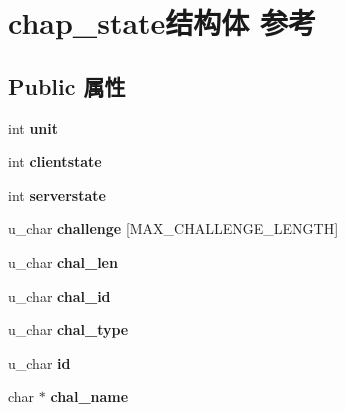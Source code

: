 \hypertarget{structchap__state}{}\section{chap\+\_\+state结构体 参考}
\label{structchap__state}
\subsection*{Public 属性}
\begin{DoxyCompactItemize}
\item 
\mbox{\label{structchap__state_a01ffde483a24c28432ff85f5bd2199c9}} 
int {\bfseries unit}
\item 
\mbox{\label{structchap__state_a575cfd919a0e27c5e54d925aebf8072b}} 
int {\bfseries clientstate}
\item 
\mbox{\label{structchap__state_a679bd23256cec82b05f8331ad7daa7df}} 
int {\bfseries serverstate}
\item 
\mbox{\label{structchap__state_ae75ec6f82ce119c1e97dd02bd5ee96df}} 
u\+\_\+char {\bfseries challenge} \mbox{[}M\+A\+X\+\_\+\+C\+H\+A\+L\+L\+E\+N\+G\+E\+\_\+\+L\+E\+N\+G\+TH\mbox{]}
\item 
\mbox{\label{structchap__state_a7668afc28040ada978fb22db0d34f248}} 
u\+\_\+char {\bfseries chal\+\_\+len}
\item 
\mbox{\label{structchap__state_af73bc4d37575b9405353f3d00d2227d3}} 
u\+\_\+char {\bfseries chal\+\_\+id}
\item 
\mbox{\label{structchap__state_a40332b711b680d3fe127d9855d230abb}} 
u\+\_\+char {\bfseries chal\+\_\+type}
\item 
\mbox{\label{structchap__state_a8d8751b4f12637227ebddb2db53f1a71}} 
u\+\_\+char {\bfseries id}
\item 
\mbox{\label{structchap__state_a43f27cb4de836c37823620b601286faa}} 
char $\ast$ {\bfseries chal\+\_\+name}
\item 
\mbox{\label{structchap__state_a66731424e3bc0790aad06797741b004f}} 

\end{DoxyCompactItemize}
